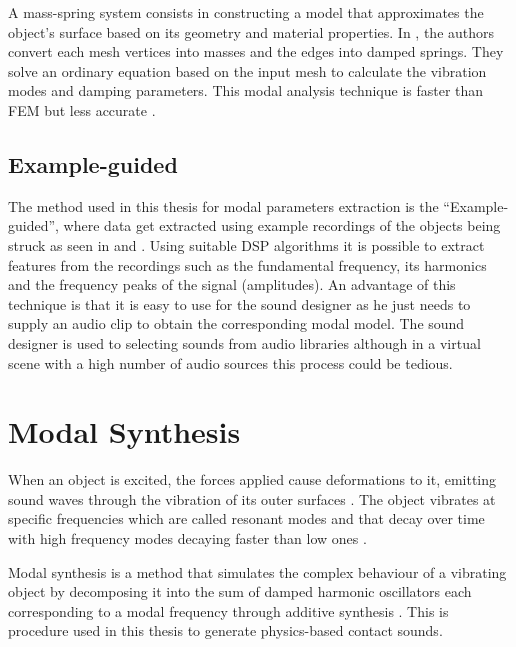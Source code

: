 A mass-spring system consists in constructing a model that approximates the object's surface based on its geometry and material properties. In \cite{raghuvanshi2006interactive}, the authors convert each mesh vertices into masses and the edges into damped springs. They solve an ordinary equation based on the input mesh to calculate the vibration modes and damping parameters. This modal analysis technique is faster than \gls{FEM} but less accurate \cite{ren2010synthesizing}.

\subsection{Example-guided}

The method used in this thesis for modal parameters extraction is the ``Example-guided'', where data get extracted using example recordings of the objects being struck as seen in \cite{lloyd2011sound} and \cite{ren2013example}. Using suitable DSP algorithms it is possible to extract features from the recordings such as the fundamental frequency, its harmonics and the frequency peaks of the signal (amplitudes). An advantage of this technique is that it is easy to use for the sound designer as he just needs to supply an audio clip to obtain the corresponding modal model. The sound designer is used to selecting sounds from audio libraries although in a virtual scene with a high number of audio sources this process could be tedious.

 
\section{Modal Synthesis}\label{sec:modal_synth}

When an object is excited, the forces applied cause deformations to it, emitting sound waves through the vibration of its outer surfaces \cite{van2001foleyautomatic}. The object vibrates at specific frequencies which are called resonant modes and that decay over time with high frequency modes decaying faster than low ones \cite{lloyd2011sound}. 

Modal synthesis is a method that simulates the complex behaviour of a vibrating object by decomposing it into the sum of damped harmonic oscillators each corresponding to a modal frequency through additive synthesis \cite{bilbao2009numerical}. This is procedure used in this thesis to generate physics-based contact sounds.



